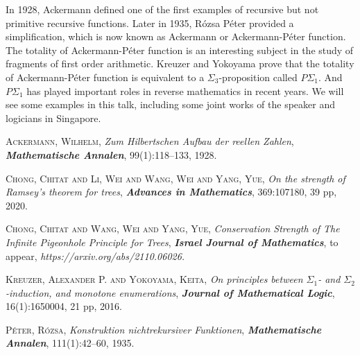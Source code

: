 \documentclass[bsl,meeting,11pt]{asl}
\newcommand{\NP}{}
\begin{document}
\thispagestyle{empty}


\NP
{}


In 1928, Ackermann \cite{Ackermann} defined one of the first examples of recursive but not primitive recursive functions.
Later in 1935, R\'{o}zsa P\'{e}ter \cite{Peter} provided a simplification, which is now known as Ackermann or Ackermann-P\'{e}ter function.
The totality of Ackermann-P\'{e}ter function is an interesting subject in the study of fragments of first order arithmetic.
Kreuzer and Yokoyama \cite{KY} prove that the totality of Ackermann-P\'{e}ter function is equivalent to a $\Sigma_3$-proposition called $P\Sigma_1$.
And $P\Sigma_1$ has played important roles in reverse mathematics in recent years.
We will see some examples in this talk, including some joint works \cite{CLWY, CWY} of the speaker and logicians in Singapore.

\begin{thebibliography}{1}

{\scshape Ackermann, Wilhelm},
{\itshape Zum {H}ilbertschen {A}ufbau der reellen {Z}ahlen},
{\bfseries\itshape Mathematische Annalen}, 99(1):118--133, 1928.

{\scshape Chong, Chitat and Li, Wei and Wang, Wei and Yang, Yue},
{\itshape On the strength of Ramsey's theorem for trees},
{\bfseries\itshape Advances in Mathematics}, 369:107180, 39 pp, 2020.

{\scshape Chong, Chitat and Wang, Wei and Yang, Yue},
{\itshape Conservation Strength of The Infinite Pigeonhole Principle for Trees},
{\bfseries\itshape Israel Journal of Mathematics}, to appear,
{\itshape https://arxiv.org/abs/2110.06026.}

{\scshape Kreuzer, Alexander P. and Yokoyama, Keita},
{\itshape On principles between $\Sigma_1$- and $\Sigma_2$-induction, and monotone enumerations},
{\bfseries\itshape Journal of Mathematical Logic}, 16(1):1650004, 21 pp, 2016.

{\scshape P\'{e}ter, R\'{o}zsa},
{\itshape Konstruktion nichtrekursiver {F}unktionen},
{\bfseries\itshape Mathematische Annalen}, 111(1):42--60, 1935.

\end{thebibliography}

\vspace*{-0.5\baselineskip}
\end{document}
